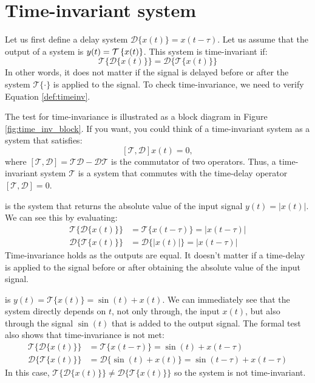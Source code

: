 \section{Time-invariant system}

Let us first define a delay system $\mathcal{D}\{x(t)\} = x(t-\tau)$. 
Let us assume that the output of a system is $y(t) = \spop[x(t)]$. 
This system is time-invariant if:
\begin{equation}
   \boxed{
      \mathcal{T}\{\mathcal{D}\{x(t)\}\} = \mathcal{D}\{\mathcal{T}\{x(t)\}\}
      \label{def:timeinv}
   }
\end{equation}
In other words, it does not matter if the signal is delayed before or
after the system $\mathcal{T}\{\cdot\}$ is applied to the signal. To
check time-invariance, we need to verify Equation \ref{def:timeinv}.

The test for time-invariance is illustrated as a block diagram in Figure \ref{fig:time_inv_block}.
If you want, you could think of a time-invariant system as a system that satisfies:
$$[\mathcal{T},\mathcal{D}]x(t)=0,$$
where $[\mathcal{T},\mathcal{D}]=\mathcal{T}\mathcal{D}-\mathcal{D}\mathcal{T}$ is the commutator of two operators.
Thus, a time-invariant system $\mathcal{T}$ is a system that commutes with the time-delay operator $[\mathcal{T},\mathcal{D}]=0$.

 is the system that returns the 
absolute value of the input signal $y(t)=|x(t)|$. We can see this by evaluating:
\begin{align}
   \mathcal{T}\{\mathcal{D}\{x(t)\}\} & = \mathcal{T}\{x(t-\tau)\}=|x(t-\tau)| \\
   \mathcal{D}\{\mathcal{T}\{x(t)\}\} & = \mathcal{D}\{|x(t)|\}=|x(t-\tau)|
\end{align}
Time-invariance holds as the outputs are equal. It doesn't matter if a time-delay is 
applied to the signal before or after obtaining the absolute value of the input signal.

 is $y(t) = \mathcal{T}\{x(t)\} = \sin(t) + x(t)$. 
We can immediately see that the system directly depends on $t$, not
only through, the input $x(t)$, but also through the signal $\sin(t)$
that is added to the output signal. The formal test also shows that
time-invariance is not met:
\begin{align}
   \mathcal{T}\{\mathcal{D}\{x(t)\}\} & = \mathcal{T}\{x(t-\tau)\}=\sin(t)+x(t-\tau)       \\
   \mathcal{D}\{\mathcal{T}\{x(t)\}\} & = \mathcal{D}\{\sin(t) + x(t)\}=\sin(t-\tau)+x(t-\tau)
\end{align}
In this case, $\mathcal{T}\{\mathcal{D}\{x(t)\}\}\neq\mathcal{D}\{\mathcal{T}\{x(t)\}\}$ so the system is not time-invariant.

